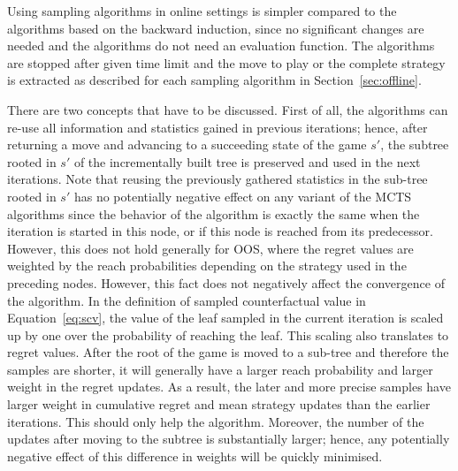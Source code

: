 
Using sampling algorithms in online settings is simpler compared to the algorithms based on the backward induction, since no significant changes are needed and the algorithms do not need an evaluation function.
The algorithms are stopped after given time limit and the move to play or the complete strategy is extracted as described for each sampling algorithm in Section~\ref{sec:offline}.

There are two concepts that have to be discussed.
First of all, the algorithms can re-use all information and statistics gained in previous iterations; hence, after returning a move and advancing to a succeeding state of the game $s'$, the subtree rooted in $s'$ of the incrementally built tree is preserved and used in the next iterations.
Note that reusing the previously gathered statistics in the sub-tree rooted in $s'$ has no potentially negative effect on any variant of the MCTS algorithms since the behavior of the algorithm is exactly the same when the iteration is started in this node, or if this node is reached from its predecessor. However, this does not hold generally for OOS, where the regret values are weighted by the reach probabilities depending on the strategy used in the preceding nodes.  However, this fact does not negatively affect the convergence of the algorithm. In the definition of sampled counterfactual value in Equation~\ref{eq:scv}, the value of the leaf sampled in the current iteration is scaled up by one over the probability of reaching the leaf. This scaling also translates to regret values. After the root of the game is moved to a sub-tree and therefore the samples are shorter, it will generally have a larger reach probability and larger weight in the regret updates. As a result, the later and more precise samples have larger weight in cumulative regret and mean strategy updates than the earlier iterations. This should only help the algorithm. Moreover, the number of the updates after moving to the subtree is substantially larger; hence, any potentially negative effect of this difference in weights will be quickly minimised.

